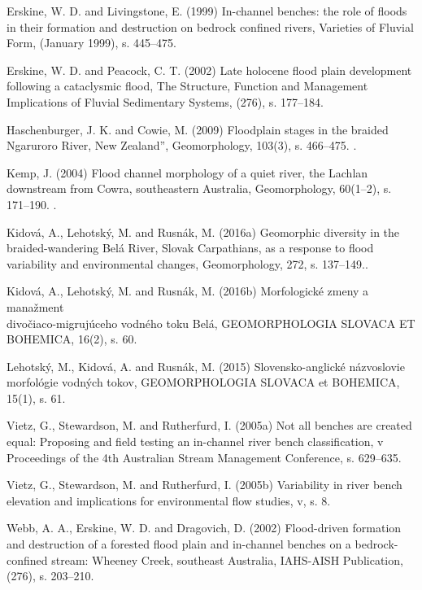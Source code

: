 {Erskine, W. D. and Livingstone, E. (1999) In-channel benches: the role of floods in their formation and destruction on bedrock confined rivers, Varieties of Fluvial Form, (January 1999), s. 445–475.
	
Erskine, W. D. and Peacock, C. T. (2002) Late holocene flood plain development following a cataclysmic flood, The Structure, Function and Management Implications of Fluvial Sedimentary Systems, (276), s. 177–184.
	
Haschenburger, J. K. and Cowie, M. (2009) Floodplain stages in the braided Ngaruroro River, New Zealand”, Geomorphology, 103(3), s. 466–475. .
	
Kemp, J. (2004) Flood channel morphology of a quiet river, the Lachlan downstream from Cowra, southeastern Australia, Geomorphology, 60(1–2), s. 171–190. .
	
Kidová, A., Lehotský, M. and Rusnák, M. (2016a) Geomorphic diversity in the braided-wandering Belá River, Slovak Carpathians, as a response to flood variability and environmental changes, Geomorphology, 272, s. 137–149..
	
Kidová, A., Lehotský, M. and Rusnák, M. (2016b) Morfologické zmeny a manažment \\divočiaco-migrujúceho vodného toku Belá, GEOMORPHOLOGIA SLOVACA ET BOHEMICA, 16(2), s. 60.
	
Lehotský, M., Kidová, A. and Rusnák, M. (2015) Slovensko-anglické názvoslovie morfológie vodných tokov, GEOMORPHOLOGIA SLOVACA et BOHEMICA, 15(1), s. 61.
	
Vietz, G., Stewardson, M. and Rutherfurd, I. (2005a) Not all benches are created equal: Proposing and field testing an in-channel river bench classification, v Proceedings of the 4th Australian Stream Management Conference, s. 629–635.
	
Vietz, G., Stewardson, M. and Rutherfurd, I. (2005b) Variability in river bench elevation and implications for environmental flow studies, v, s. 8.
	
Webb, A. A., Erskine, W. D. and Dragovich, D. (2002) Flood-driven formation and destruction of a forested flood plain and in-channel benches on a bedrock-confined stream: Wheeney Creek, southeast Australia, IAHS-AISH Publication, (276), s. 203–210.
}%

